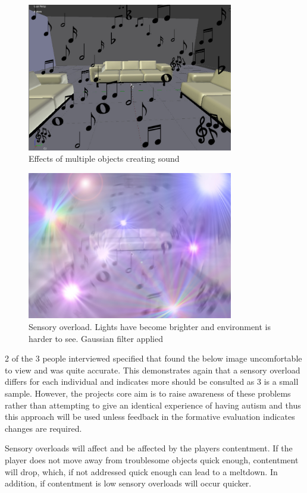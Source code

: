 \documentclass[11pt]{report}
\begin{document}
\begin{figure}[H]
\centering
\includegraphics[width=90mm]{images/GD_moresound.jpg}
\caption{Effects of multiple objects creating sound}
\label{sensorymockup2}
\end{figure}

\begin{figure}[H]
\centering
\includegraphics[width=90mm]{images/GD_overload.jpg}
\caption{Sensory overload. Lights have become brighter and environment is harder to see. Gaussian filter applied}
\label{sensoryoverloadmockup}
\end{figure}

2 of the 3 people interviewed specified that found the below image uncomfortable to view and was quite accurate. This demonstrates again that a sensory overload differs for each individual and indicates more should be consulted as 3 is a small sample. However, the projects core aim is to raise awareness of these problems rather than attempting to give an identical experience of having autism and thus this approach will be used unless feedback in the formative evaluation indicates changes are required. 

Sensory overloads will affect and be affected by the players contentment. If the player does not move away from troublesome objects quick enough, contentment will drop, which, if not addressed quick enough can lead to a meltdown. In addition, if contentment is low sensory overloads will occur quicker. 
\end{document}
